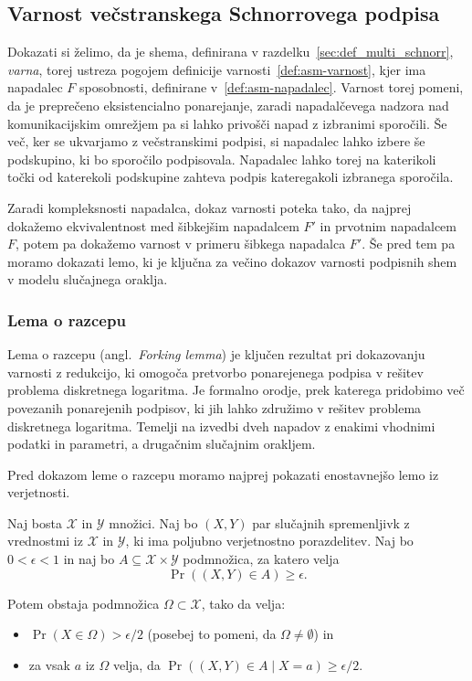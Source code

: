 \subsection{Varnost večstranskega Schnorrovega podpisa}
\label{sec:proof_multi_schnorr}
Dokazati si želimo, da je shema, definirana v razdelku~\ref{sec:def_multi_schnorr}, \textit{varna},
torej ustreza pogojem definicije varnosti~\ref{def:asm-varnost}, kjer ima napadalec $F$ sposobnosti,
definirane v~\ref{def:asm-napadalec}. Varnost torej pomeni, da je preprečeno eksistencialno ponarejanje,
zaradi napadalčevega nadzora nad komunikacijskim omrežjem pa si lahko privošči napad z izbranimi sporočili.
Še več, ker se ukvarjamo z večstranskimi podpisi, si napadalec lahko izbere še podskupino, ki bo 
sporočilo podpisovala. Napadalec lahko torej na katerikoli točki od katerekoli podskupine zahteva
podpis kateregakoli izbranega sporočila.

Zaradi kompleksnosti napadalca, dokaz varnosti poteka tako, da najprej dokažemo ekvivalentnost med
šibkejšim napadalcem $F'$ in prvotnim napadalcem $F$, potem pa dokažemo varnost v primeru šibkega
napadalca $F'$. Še pred tem pa moramo dokazati lemo, ki je ključna za večino dokazov varnosti podpisnih
shem v modelu slučajnega oraklja.

\subsubsection{Lema o razcepu}
Lema o razcepu (angl.\ \textit{Forking lemma}) je ključen rezultat pri dokazovanju varnosti z redukcijo,
ki omogoča pretvorbo ponarejenega podpisa v rešitev problema diskretnega logaritma. Je formalno orodje,
prek katerega pridobimo več povezanih ponarejenih podpisov, ki jih lahko združimo v rešitev problema
diskretnega logaritma. Temelji na izvedbi dveh napadov z enakimi vhodnimi podatki in parametri, a
drugačnim slučajnim orakljem.

Pred dokazom leme o razcepu moramo najprej pokazati enostavnejšo lemo iz verjetnosti.

\begin{lema}
\label{lema:verjetnost}
    Naj bosta $\mathcal{X}$ in $\mathcal{Y}$ množici. Naj bo $(X, Y)$ par slučajnih spremenljivk z
    vrednostmi iz $\mathcal{X}$ in $\mathcal{Y}$, ki ima poljubno verjetnostno porazdelitev. Naj bo
    $0 < \epsilon < 1$ in naj bo $A \subseteq \mathcal{X} \times \mathcal{Y}$ podmnožica, za katero
    velja
    $$
    \Pr((X, Y) \in A) \geq \epsilon.
    $$

    Potem obstaja podmnožica $\Omega \subset \mathcal{X}$, tako da velja:
    \begin{itemize}
        \item $\Pr(X \in \Omega) > \epsilon / 2$ (posebej to pomeni, da $\Omega \neq \emptyset$) in
        \item za vsak $a$ iz $\Omega$ velja, da $\Pr((X, Y) \in A \mid X = a) \geq \epsilon / 2$.
    \end{itemize}
\end{lema}

